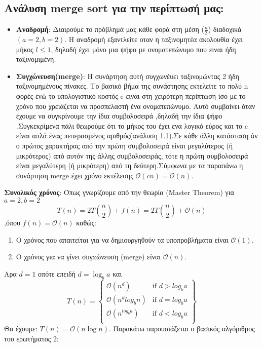 \documentclass[a4paper]{article}
\begin{document}
\subsection*{Ανάλυση merge sort για την περίπτωσή μας:}
\begin{itemize}
\item\textbf{Αναδρομή}: Διαιρούμε το πρόβλημά μας κάθε φορά στη μέση ($\frac{n}{2}$) διαδοχικά $(a=2,b=2)$. Η αναδρομή εξαντλείτε  οταν η ταξινομητέα ακολουθία έχει μήκος $l\leq1$, δηλαδή έχει μόνο μια ψήφο με ονοματεπώνυμο που ειναι ήδη ταξινομιμένη.
\item \textbf{Συγχώνευση(merge)}: Η συνάρτηση αυτή συγχωνέυει ταξινομώντας 2 ήδη ταξινομημένους πίνακες. Το βασικό βήμα της συνάστησης εκτελείτε το πολύ n φορές ενώ το υπολογιστικό κοστός c ειναι στη χειρότερη περίπτωση  ίσο με το χρόνο που χρειάζεται να προσπελαστή ένα ονοματεπώνυμο. Αυτό συμβαίνει όταν έχουμε να συγκρίνουμε την ίδια συμβολοσειρά ,δηλαδή την ίδια ψήφο .Συγκεκρίμενα  πάλι θεωρούμε ότι το μήκος του έχει ενα λογικό εύρος και το c είναι απλά ένας πεπερασμένος αριθμός(ανάλυση 1.1).Σε κάθε άλλη κατάσταση άν ο πρώτος χαρακτήρας από την πρώτη συμβολοσειρά είναι μεγαλύτερος (ή μικρότερος) από αυτόν της άλλης συμβολοσειράς, τότε η πρώτη συμβολοσειρά είναι μεγαλύτερη (ή μικρότερη) από τη δεύτερη.Σύμφωνα με τα παραπάνω η συνάρτηση merge έχει χρόνο εκτέλεσης \textbf{$\mathcal{O}(cn)=\mathcal{O}(n)$}.
\end{itemize}
\textbf{Συνολικός χρόνος}: Όπως γνωρίζουμε από την θεωρία (Master Theorem) για $a=2,b=2$ $$T(n)=2T(\frac{n}{2})+f(n)=2T(\frac{n}{2})+\mathcal{O}(n)$$,όπου $f(n)=\mathcal{O}(n)$ καθώς:
\begin{enumerate}
\item Ο χρόνος που απαιτείται για να δημιουργηθούν τα υποπροβλήματα είναι $\mathcal{O}(1)$.
\item Ο χρόνος για να γίνει συγxώνευση (merge) είναι $\mathcal{O}(n)$.
\end{enumerate}
Aρα $d=1$ οπότε επειδή $d=\log_b{a}$ και 
$$T(n)=
\left\{\begin{array}{lr}
\mathcal{O}(n^d)          & \text{if } d>log_b{a}\\
\mathcal{O}(n^dlog_b{n})  & \text{if } d=log_b{a}\\
\mathcal{O}(n^{log_b{a}}) & \text{if } d<log_b{a}\\
\end{array}\right\}$$
Θα έχουμε: $T(n)=\mathcal{O}(n\log{n})$. Παρακάτω παρουσιάζεται ο βασικός αλγόριθμος του ερωτήματος 2: 
\end{document}
